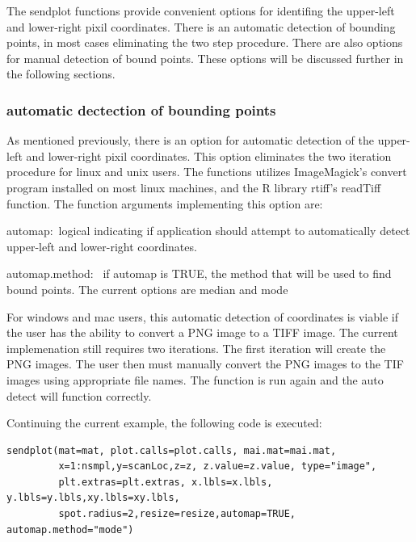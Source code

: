 \documentclass[]{article}
\begin{document}
\indent The sendplot functions provide convenient options for identifing the upper-left and lower-right pixil coordinates. There is an automatic detection of bounding points, in most cases eliminating the two step procedure. There are also options for manual detection of bound points. These options will be discussed further in the following sections.  

\subsubsection{automatic dectection of bounding points}

\indent As mentioned previously, there is an option for automatic detection of the upper-left and lower-right pixil coordinates. This option eliminates the two iteration procedure for linux and unix users. The functions utilizes ImageMagick's convert program installed on most linux machines, and the R library rtiff's readTiff function. The function arguments implementing this option are:
\begin{description}
 \item{automap:~}{logical indicating if application should
    attempt to automatically detect upper-left and lower-right 
    coordinates.}

  \item{automap.method:~ }{if automap is TRUE, the method that will be
    used to find bound points. The current options are median and mode}

 \end{description}

\indent For windows and mac users, this automatic detection of coordinates is viable if the user has the ability to convert a PNG image to a TIFF image. The current implemenation still requires two iterations. The first iteration will create the PNG images. The user then must manually convert the PNG images to the TIF images using appropriate file names. The function is run again and the auto detect will function correctly.  

\indent Continuing the current example, the following code is executed:
\begin{verbatim}
sendplot(mat=mat, plot.calls=plot.calls, mai.mat=mai.mat,
         x=1:nsmpl,y=scanLoc,z=z, z.value=z.value, type="image",
         plt.extras=plt.extras, x.lbls=x.lbls, y.lbls=y.lbls,xy.lbls=xy.lbls, 
         spot.radius=2,resize=resize,automap=TRUE, automap.method="mode")
\end{verbatim}
\end{document}
